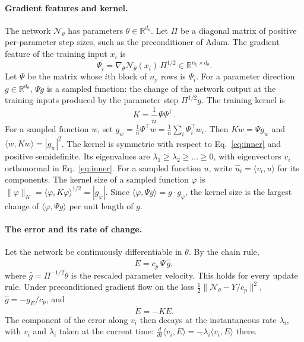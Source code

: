 \documentclass[11pt]{article}
\theoremstyle{definition}
\theoremstyle{remark}
\newcommand{\R}{\mathbb{R}}
\newcommand{\Net}{\mathcal{N}_\theta}    %
\newcommand{\ip}[2]{\langle #1,#2\rangle}
\begin{document}
\paragraph{Gradient features and kernel.}
The network $\Net$ has parameters $\theta\in\R^{d_\theta}$.
Let $\Pi$ be a diagonal matrix of positive per-parameter step sizes, such as the preconditioner of Adam.
The gradient feature of the training input $x_i$ is
\begin{equation}\label{eq:feature}
\Psi_i = \nabla_\theta\Net(x_i)\,\Pi^{1/2} \in \R^{n_{\mathrm y}\times d_\theta}.
\end{equation}
Let $\Psi$ be the matrix whose $i$th block of $n_{\mathrm y}$ rows is $\Psi_i$.
For a parameter direction $g\in\R^{d_\theta}$, $\Psi g$ is a sampled function: the change of the network output at the training inputs produced by the parameter step $\Pi^{1/2}g$.
The training kernel is
\begin{equation}\label{eq:kernel}
K = \frac1n\,\Psi\Psi^\top .
\end{equation}
For a sampled function $w$, set $g_w = \tfrac1n\Psi^\top w = \tfrac1n\sum_i\Psi_i^\top w_i$.
Then $Kw = \Psi g_w$ and $\ip{w}{Kw} = |g_w|^2$.
The kernel is symmetric with respect to Eq.~\eqref{eq:inner} and positive semidefinite.
Its eigenvalues are $\lambda_1\ge\lambda_2\ge\dots\ge0$, with eigenvectors $v_i$ orthonormal in Eq.~\eqref{eq:inner}.
For a sampled function $u$, write $\hat u_i = \ip{v_i}{u}$ for its components.
The kernel size of a sampled function $\varphi$ is $\|\varphi\|_K = \ip{\varphi}{K\varphi}^{1/2} = |g_\varphi|$.
Since $\ip{\varphi}{\Psi g} = g\cdot g_\varphi$, the kernel size is the largest change of $\ip{\varphi}{\Psi g}$ per unit length of $g$.

\paragraph{The error and its rate of change.}
Let the network be continuously differentiable in $\theta$.
By the chain rule,
\begin{equation}\label{eq:Edot}
\dot E = c_p\,\Psi\,\hat g,
\end{equation}
where $\hat g = \Pi^{-1/2}\dot\theta$ is the rescaled parameter velocity.
This holds for every update rule.
Under preconditioned gradient flow on the loss $\tfrac12\|\Net - Y/c_p\|^2$, $\hat g = -g_E/c_p$, and
\begin{equation}\label{eq:Edotgf}
\dot E = -K E .
\end{equation}
The component of the error along $v_i$ then decays at the instantaneous rate $\lambda_i$, with $v_i$ and $\lambda_i$ taken at the current time: $\frac{d}{dt}\ip{v_i}{E} = -\lambda_i\ip{v_i}{E}$ there.
\end{document}
